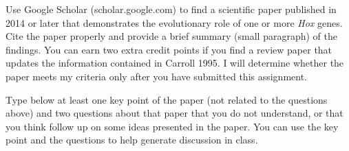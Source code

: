 \documentclass[11pt, addpoints]{exam}
\begin{document}
\begin{questions}
\question[5]
Use Google Scholar (scholar.google.com) to find a scientific paper
  published in 2014 or later that demonstrates the evolutionary role of
  one or more \emph{Hox} genes. Cite the paper properly and provide a
  brief summary (small paragraph) of the findings. You can earn two extra credit points if you find a review paper that updates the information contained in Carroll 1995. I will determine whether the paper meets my criteria only after you have submitted this assignment.


\question[5]
Type below at least one key point of the paper (not related to the
  questions above) and two questions about that paper that you do not
  understand, or that you think follow up on some ideas presented in the
  paper. You can use the key point and the questions to help generate
  discussion in class. 


\end{questions}
\end{document}
